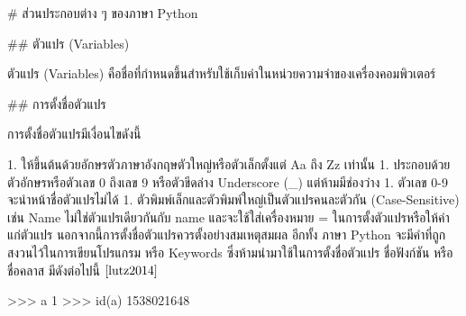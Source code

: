 \begin{markdown}

# ส่วนประกอบต่าง ๆ ของภาษา Python

## ตัวแปร (Variables)

ตัวแปร (Variables) คือชื่อที่กำหนดขึ้นสำหรับใช้เก็บค่าในหน่วยความจำของเครื่องคอมพิวเตอร์

## การตั้งชื่อตัวแปร

การตั้งชื่อตัวแปรมีเงื่อนไขดังนี้

1. ให้ขึ้นต้นด้วยอักษรตัวภาษาอังกฤษตัวใหญ่หรือตัวเล็กตั้งแต่ Aa ถึง Zz เท่านั้น 
1. ประกอบด้วยตัวอักษรหรือตัวเลข 0 ถึงเลข 9 หรือตัวขีดล่าง Underscore (_) แต่ห้ามมีช่องว่าง
1. ตัวเลข 0-9 จะนำหน้าชื่อตัวแปรไม่ได้
1. ตัวพิมพ์เล็กและตัวพิมพ์ใหญ่เป็นตัวแปรคนละตัวกัน (Case-Sensitive) เช่น Name ไม่ใช่ตัวแปรเดียวกันกับ name และจะใช้ใส่เครื่องหมาย = ในการตั้งตัวแปรหรือให้ค่าแก่ตัวแปร นอกจากนี้การตั้งชื่อตัวแปรควรตั้งอย่างสมเหตุสมผล อีกทั้ง ภาษา Python จะมีคำที่ถูกสงวนไว้ในการเขียนโปรแกรม หรือ Keywords ซึ่งห้ามนำมาใช้ในการตั้งชื่อตัวแปร ชื่อฟังก์ชัน หรือ ชื่อคลาส มีดังต่อไปนี้ $\cite{lutz2014}$


\end{markdown}

\cite{lutz2014}

\begin{pycode}
>>> a
1
>>> id(a)
1538021648
\end{pycode}
